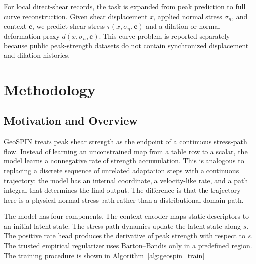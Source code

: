 \documentclass[journal]{IEEEtran}
\begin{document}
For local direct-shear records, the task is expanded from peak prediction to full curve reconstruction. Given shear displacement $x$, applied normal stress $\sigma_n$, and context $\mathbf{c}$, we predict shear stress $\tau(x,\sigma_n,\mathbf{c})$ and a dilation or normal-deformation proxy $d(x,\sigma_n,\mathbf{c})$. This curve problem is reported separately because public peak-strength datasets do not contain synchronized displacement and dilation histories.

\section{Methodology}
\subsection{Motivation and Overview}
GeoSPIN treats peak shear strength as the endpoint of a continuous stress-path flow. Instead of learning an unconstrained map from a table row to a scalar, the model learns a nonnegative rate of strength accumulation. This is analogous to replacing a discrete sequence of unrelated adaptation steps with a continuous trajectory: the model has an internal coordinate, a velocity-like rate, and a path integral that determines the final output. The difference is that the trajectory here is a physical normal-stress path rather than a distributional domain path.

The model has four components. The context encoder maps static descriptors to an initial latent state. The stress-path dynamics update the latent state along $s$. The positive rate head produces the derivative of peak strength with respect to $s$. The trusted empirical regularizer uses Barton--Bandis only in a predefined region. The training procedure is shown in Algorithm~\ref{alg:geospin_train}.
\end{document}
